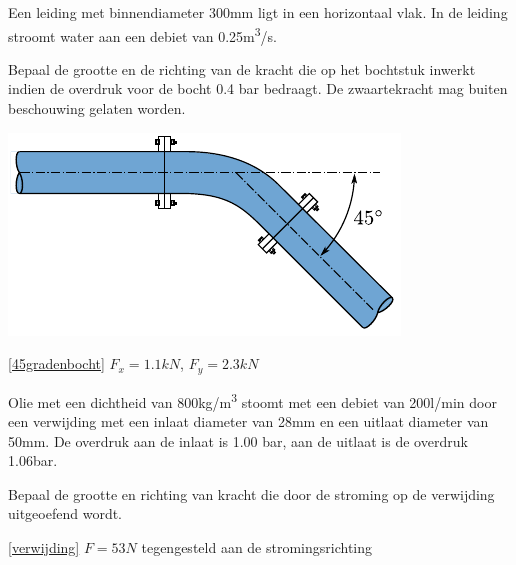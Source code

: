 \begin{toepassing}[*]
	\label{45gradenbocht}
Een leiding met binnendiameter 300mm ligt in een horizontaal vlak. In de leiding stroomt water aan een debiet van 0.25\unit{m^3/s}.    

Bepaal de grootte en de richting van de kracht die op het bochtstuk inwerkt indien de overdruk voor de bocht 0.4 bar bedraagt. De zwaartekracht mag buiten beschouwing gelaten worden.

	\centering
	\includegraphics{fig/behoudsvergelijkingen/45gradenbocht}
\end{toepassing}
\begin{antwoord}{\ref{45gradenbocht}}
	$F_x = 1.1\unit{kN}$, $F_y = 2.3\unit{kN}$
\end{antwoord}
\begin{toepassing}[*]
	\label{verwijding}
Olie met een dichtheid van 800\unit{kg/m^3} stoomt met een debiet van 200l/min door een verwijding met een inlaat diameter van 28mm en een uitlaat diameter van 50mm. De overdruk aan de inlaat is 1.00 bar, aan de uitlaat is de overdruk 1.06bar.

Bepaal de grootte en richting van kracht die door de stroming op de verwijding uitgeoefend wordt.
\end{toepassing}
\begin{antwoord}{\ref{verwijding}}
	$F = 53\unit{N}$ tegengesteld aan de stromingsrichting
\end{antwoord}
